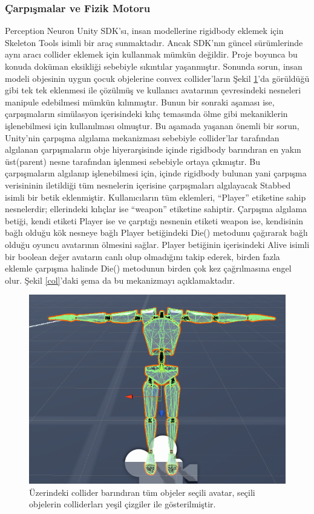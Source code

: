 \documentclass[a4paper, 12pt, titlepage]{article}
\begin{document}
\subsubsection{Çarpışmalar ve Fizik Motoru}
Perception Neuron Unity SDK’sı, insan modellerine rigidbody eklemek için Skeleton Tools isimli bir
araç sunmaktadır. Ancak SDK’nın güncel sürümlerinde aynı aracı collider eklemek için kullanmak
mümkün değildir. Proje boyunca bu konuda doküman eksikliği sebebiyle sıkıntılar yaşanmıştır.
Sonunda sorun, insan modeli objesinin uygun çocuk objelerine convex collider’ların Şekil \ref{c}’da
görüldüğü gibi tek tek eklenmesi ile çözülmüş ve kullanıcı avatarının çevresindeki nesneleri
manipule edebilmesi mümkün kılınmıştır. Bunun bir sonraki aşaması ise, çarpışmaların simülasyon
içerisindeki kılıç temasında ölme gibi mekaniklerin işlenebilmesi için kullanılması olmuştur. Bu
aşamada yaşanan önemli bir sorun, Unity’nin çarpışma algılama mekanizması sebebiyle collider’lar
tarafından algılanan çarpışmaların obje hiyerarşisinde içinde rigidbody barındıran en yakın
üst(parent) nesne tarafından işlenmesi sebebiyle ortaya çıkmıştır. Bu çarpışmaların algılanıp
işlenebilmesi için, içinde rigidbody bulunan yani çarpışma verisininin iletildiği tüm nesnelerin
içerisine çarpışmaları algılayacak Stabbed isimli bir betik eklenmiştir. Kullanıcıların tüm
eklemleri, “Player” etiketine sahip nesnelerdir; ellerindeki kılıçlar ise “weapon” etiketine
sahiptir. Çarpışma algılama betiği, kendi etiketi Player ise ve çarptığı nesnenin etiketi weapon
ise, kendisinin bağlı olduğu kök nesneye bağlı Player betiğindeki Die() metodunu çağırarak bağlı
olduğu oyuncu avatarının ölmesini sağlar. Player betiğinin içerisindeki Alive isimli bir boolean
değer avatarın canlı olup olmadığını takip ederek, birden fazla eklemle çarpışma halinde Die()
metodunun birden çok kez çağrılmasına engel olur. Şekil \ref{col}’daki şema da bu mekanizmayı
açıklamaktadır.

\begin{figure}[ht!]
    \centering
        \includegraphics[width=5in]{images/c}
    \caption{Üzerindeki collider barındıran tüm objeler seçili avatar, seçili objelerin
             colliderları yeşil çizgiler ile gösterilmiştir.}
    \label{c}
\end{figure}
\end{document}
